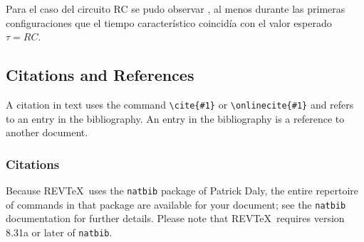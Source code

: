 \documentclass[%
 reprint,
 amsmath,amssymb,
 aps,
]{revtex4-1}
\begin{document}
{Para el caso del circuito RC se pudo observar , al menos durante las primeras configuraciones que el tiempo caracter\'istico coincid\'ia con el valor esperado $\tau = RC$.



\subsection{\label{sec:citeref}Citations and References}
A citation in text uses the command \verb+\cite{#1}+ or
\verb+\onlinecite{#1}+ and refers to an entry in the bibliography. 
An entry in the bibliography is a reference to another document.

\subsubsection{Citations}
Because REV\TeX\ uses the \verb+natbib+ package of Patrick Daly, 
the entire repertoire of commands in that package are available for your document;
see the \verb+natbib+ documentation for further details. Please note that
REV\TeX\ requires version 8.31a or later of \verb+natbib+.

}
\end{document}
